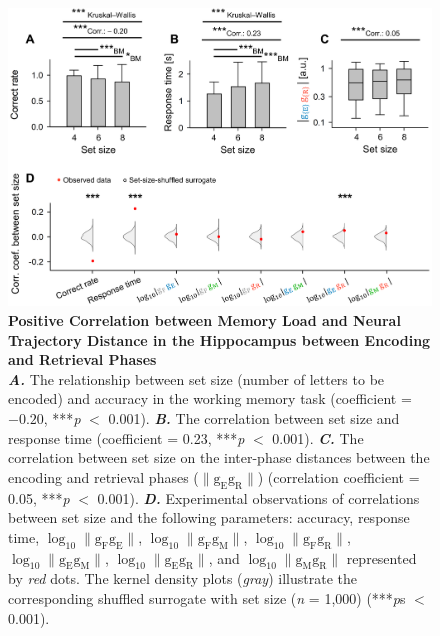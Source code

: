 \documentclass[preprint,review,12pt]{elsarticle}%
\begin{document}
        \clearpage
        \begin{figure}[ht]
        	\centering
            \includegraphics[width=1\textwidth]{./src/figures/.png/Figure_ID_03.png}
        	\caption{\textbf{
Positive Correlation between Memory Load and Neural Trajectory Distance in the Hippocampus between Encoding and Retrieval Phases
}
\smallskip
\\
\textbf{\textit{A.}} The relationship between set size (number of letters to be encoded) and accuracy in the working memory task (coefficient = $-0.20$, ***\textit{p} $<$ 0.001). \textbf{\textit{B.}} The correlation between set size and response time (coefficient = 0.23, ***\textit{p} $<$ 0.001). \textbf{\textit{C.}} The correlation between set size on the inter-phase distances between the encoding and retrieval phases ($\lVert \mathrm{g_{E}g_{R}} \rVert$) (correlation coefficient = 0.05, ***\textit{p} $<$ 0.001). \textbf{\textit{D.}} Experimental observations of correlations between set size and the following parameters: accuracy, response time, $\log_{10}{\lVert \mathrm{g_{F}g_{E}} \rVert}$, $\log_{10}{\lVert \mathrm{g_{F}g_{M}} \rVert}$, $\log_{10}{\lVert \mathrm{g_{F}g_{R}} \rVert}$, $\log_{10}{\lVert \mathrm{g_{E}g_{M}} \rVert}$, $\log_{10}{\lVert \mathrm{g_{E}g_{R}} \rVert}$, and $\log_{10}{\lVert \mathrm{g_{M}g_{R}} \rVert}$ represented by \textit{red} dots. The kernel density plots (\textit{gray}) illustrate the corresponding shuffled surrogate with set size (\textit{n} = 1,000) (***\textit{p}s $<$ 0.001).
}
        	\label{fig:03}
        \end{figure}
        \clearpage
\end{document}
